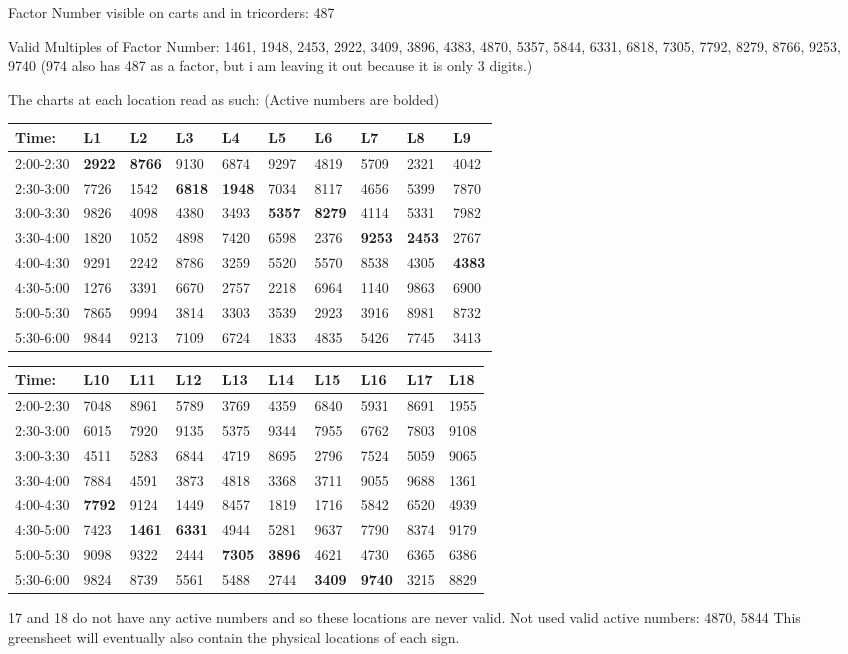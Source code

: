 \documentclass[green]{elementals}
\begin{document}
\name{\gActiveConduitLocations{}}

Factor Number visible on carts and in tricorders: 487

Valid Multiples of Factor Number: 1461, 1948, 2453, 2922, 3409, 3896, 4383, 4870, 5357, 5844, 6331, 6818, 7305, 7792, 8279, 8766, 9253, 9740 (974 also has 487 as a factor, but i am leaving it out because it is only 3 digits.)

The charts at each location read as such: (Active numbers are bolded)\\

\begin{tabular}{ l || l |  l | l | l | l | l | l | l | l |}
  Time: & L1 & L2 & L3 & L4 & L5 & L6 & L7 & L8 & L9  \\ \hline \hline
  2:00-2:30 & {\bf 2922} & {\bf 8766} & 9130 & 6874 & 9297 & 4819 & 5709 & 2321 & 4042 \\ \hline
  2:30-3:00 & 7726 & 1542 & {\bf 6818} & {\bf 1948} & 7034 & 8117 & 4656 & 5399 & 7870 \\ \hline
  3:00-3:30 & 9826 & 4098 & 4380 & 3493 & {\bf 5357} & {\bf 8279} & 4114 & 5331 & 7982 \\ \hline
  3:30-4:00 & 1820 & 1052 & 4898 & 7420 & 6598 & 2376 & {\bf 9253} & {\bf 2453} & 2767 \\ \hline
  4:00-4:30 & 9291 & 2242 & 8786 & 3259 & 5520 & 5570& 8538 & 4305 & {\bf 4383} \\ \hline
  4:30-5:00 & 1276 & 3391 & 6670 & 2757 & 2218 & 6964 & 1140 & 9863 & 6900 \\ \hline
  5:00-5:30 & 7865 & 9994 & 3814 & 3303 & 3539 & 2923 & 3916 & 8981 & 8732 \\ \hline
  5:30-6:00 & 9844 & 9213 & 7109 & 6724 & 1833 & 4835 & 5426 & 7745 & 3413 \\ \hline
\end{tabular}

\begin{tabular}{ l || l |  l | l | l | l | l | l | l | l |}
  Time: & L10 & L11 & L12 & L13 & L14 & L15 & L16 & L17 & L18  \\ \hline \hline
  2:00-2:30 & 7048 & 8961 & 5789 & 3769 & 4359 & 6840 & 5931 & 8691 & 1955  \\ \hline
  2:30-3:00 & 6015 & 7920 & 9135 & 5375 & 9344 & 7955 & 6762 & 7803 & 9108  \\ \hline
  3:00-3:30 & 4511 & 5283 & 6844 & 4719 & 8695 & 2796 & 7524 & 5059 & 9065  \\ \hline
  3:30-4:00 & 7884 & 4591 & 3873 & 4818 & 3368 & 3711 & 9055 & 9688 & 1361  \\ \hline
  4:00-4:30 & {\bf 7792} & 9124& 1449 & 8457 & 1819 & 1716 & 5842 & 6520 & 4939  \\ \hline
  4:30-5:00 & 7423 & {\bf 1461} & {\bf 6331} & 4944 & 5281 & 9637 & 7790 & 8374 & 9179  \\ \hline
  5:00-5:30 & 9098 & 9322 & 2444 & {\bf 7305} & {\bf 3896} & 4621 & 4730 & 6365 & 6386  \\ \hline
  5:30-6:00 & 9824 & 8739 & 5561 & 5488 & 2744 & {\bf 3409} & {\bf 9740} & 3215 & 8829  \\ \hline
\end{tabular}

17 and 18 do not have any active numbers and so these locations are never valid.
Not used valid active numbers: 4870, 5844
This greensheet will eventually also contain the physical locations of each sign.
\end{document}
